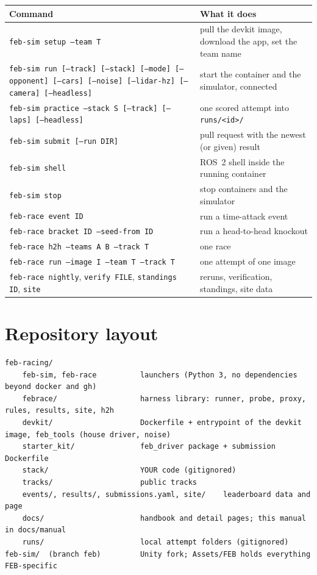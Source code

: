 \documentclass[11pt,a4paper]{article}
\newcommand{\file}[1]{\texttt{#1}}
\newcommand{\cmd}[1]{\texttt{#1}}
\begin{document}
\begin{tabularx}{\linewidth}{p{7.2cm}X}
\toprule
Command & What it does\\
\midrule
\cmd{feb-sim setup --team T} & pull the devkit image, download the app, set the team name\\
\cmd{feb-sim run [--track] [--stack] [--mode] [--opponent] [--cars] [--noise] [--lidar-hz] [--camera] [--headless]} & start the container and the simulator, connected\\
\cmd{feb-sim practice --stack S [--track] [--laps] [--headless]} & one scored attempt into \file{runs/<id>/}\\
\cmd{feb-sim submit [--run DIR]} & pull request with the newest (or given) result\\
\cmd{feb-sim shell} & ROS~2 shell inside the running container\\
\cmd{feb-sim stop} & stop containers and the simulator\\
\midrule
\cmd{feb-race event ID} & run a time-attack event\\
\cmd{feb-race bracket ID --seed-from ID} & run a head-to-head knockout\\
\cmd{feb-race h2h --teams A B --track T} & one race\\
\cmd{feb-race run --image I --team T --track T} & one attempt of one image\\
\cmd{feb-race nightly}, \cmd{verify FILE}, \cmd{standings ID}, \cmd{site} & reruns, verification, standings, site data\\
\bottomrule
\end{tabularx}

\section{Repository layout}

\begin{lstlisting}
feb-racing/
    feb-sim, feb-race          launchers (Python 3, no dependencies beyond docker and gh)
    febrace/                   harness library: runner, probe, proxy, rules, results, site, h2h
    devkit/                    Dockerfile + entrypoint of the devkit image, feb_tools (house driver, noise)
    starter_kit/               feb_driver package + submission Dockerfile
    stack/                     YOUR code (gitignored)
    tracks/                    public tracks
    events/, results/, submissions.yaml, site/    leaderboard data and page
    docs/                      handbook and detail pages; this manual in docs/manual
    runs/                      local attempt folders (gitignored)
feb-sim/  (branch feb)         Unity fork; Assets/FEB holds everything FEB-specific
\end{lstlisting}
\end{document}
